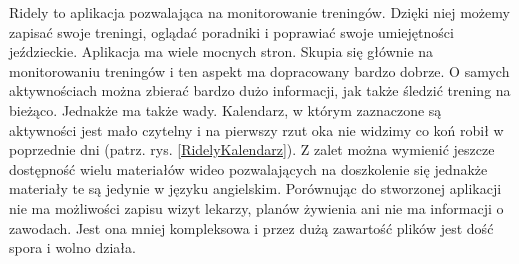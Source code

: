 \documentclass[12pt,oneside]{report}
\begin{document}
Ridely to aplikacja pozwalająca na monitorowanie treningów. Dzięki niej możemy zapisać swoje treningi, oglądać poradniki i poprawiać swoje umiejętności jeździeckie. 
Aplikacja ma wiele mocnych stron. Skupia się głównie na monitorowaniu treningów i ten aspekt ma dopracowany bardzo dobrze. O samych aktywnościach można zbierać bardzo dużo informacji, jak także śledzić trening na bieżąco. Jednakże ma także wady. Kalendarz, w którym zaznaczone są aktywności jest mało czytelny i na pierwszy rzut oka nie widzimy co koń robił w poprzednie dni (patrz. rys. \ref{RidelyKalendarz}).
Z zalet można wymienić jeszcze dostępność wielu materiałów wideo pozwalających na doszkolenie się jednakże materiały te są jedynie w języku angielskim. Porównując do stworzonej aplikacji nie ma możliwości zapisu wizyt lekarzy, planów żywienia ani nie ma informacji o zawodach. Jest ona mniej kompleksowa i przez dużą zawartość plików jest dość spora i wolno działa. 
\end{document}

